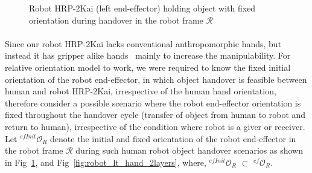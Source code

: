 \documentclass[a4paper, 12pt, oneside]{Thesis}  %
\begin{document}
\begin{figure}[ht]
	\caption{Robot HRP-2Kai (left end-effector) holding object with fixed orientation during handover in the robot frame $\mathcal{R}$}
	\label{fig:robot_lt_hand_obj}
\end{figure} 

\paragraph*{}
Since our robot HRP-2Kai lacks conventional anthropomorphic hands, but instead it has gripper alike hands~\cite{kaneko2015humanoid, stasse2019overview} mainly to increase the manipulability. For relative orientation model to work, we were required to know the fixed initial orientation of the robot end-effector, in which object handover is feasible between human and robot HRP-2Kai, irrespective of the human hand orientation, therefore consider a possible  scenario where the robot end-effector orientation is fixed throughout the handover cycle (transfer of object from human to robot and return to human), irrespective of the condition where robot is a giver or receiver. Let ${{}^{efInit}\mathcal{O}_R}$ denote the initial and fixed orientation of the robot end-effector in the robot frame $\mathcal{R}$ during such human robot object handover scenarios as shown in Fig~\ref{fig:robot_lt_hand_obj}, and Fig~\ref{fig:robot_lt_hand_2layers}, where, ${{}^{efInit}\mathcal{O}_R}$ $\subset$ ${{}^{ef}\mathcal{O}_R}$.
\end{document}
